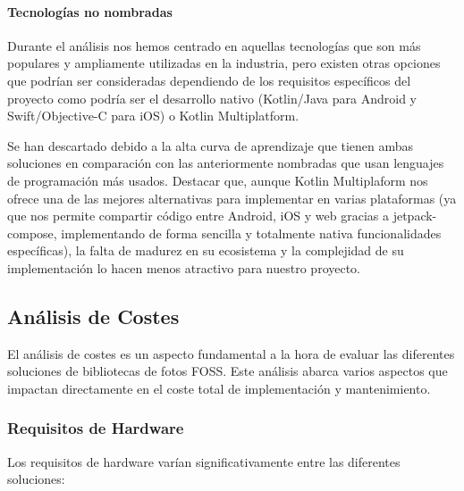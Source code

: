 \paragraph{Tecnologías no nombradas}
Durante el análisis nos hemos centrado en aquellas tecnologías que son más populares y ampliamente utilizadas en la industria, pero existen otras opciones que podrían ser consideradas dependiendo de los requisitos específicos del proyecto como podría ser el desarrollo nativo (Kotlin/Java para Android y Swift/Objective-C para iOS) o Kotlin Multiplatform.

Se han descartado debido a la alta curva de aprendizaje que tienen ambas soluciones en comparación con las anteriormente nombradas que usan lenguajes de programación más usados. Destacar que, aunque Kotlin Multiplaform nos ofrece una de las mejores alternativas para implementar en varias plataformas (ya que nos permite compartir código entre Android, iOS y web gracias a \gls{jetpack-compose}, implementando de forma sencilla y totalmente nativa funcionalidades específicas), la falta de madurez en su ecosistema y la complejidad de su implementación lo hacen menos atractivo para nuestro proyecto.

\subsection{Análisis de Costes}

El análisis de costes es un aspecto fundamental a la hora de evaluar las diferentes soluciones de bibliotecas de fotos FOSS. Este análisis abarca varios aspectos que impactan directamente en el coste total de implementación y mantenimiento.

\subsubsection{Requisitos de Hardware}

Los requisitos de hardware varían significativamente entre las diferentes soluciones:

